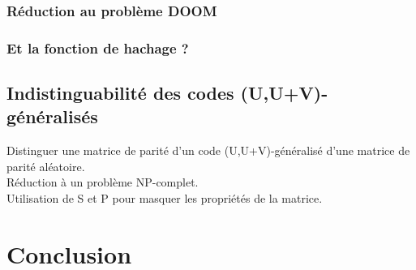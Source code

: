 \documentclass[12pt]{article}
\theoremstyle{definition}
\begin{document}
\subsubsection{Réduction au problème DOOM}
\subsubsection{Et la fonction de hachage ?}

\subsection{Indistinguabilité des codes (U,U+V)-généralisés}
Distinguer une matrice de parité d'un code (U,U+V)-généralisé d'une matrice de parité aléatoire. \\
Réduction à un problème NP-complet. \\
Utilisation de S et P pour masquer les propriétés de la matrice. \\

\section*{Conclusion}

\newpage




\end{document}
